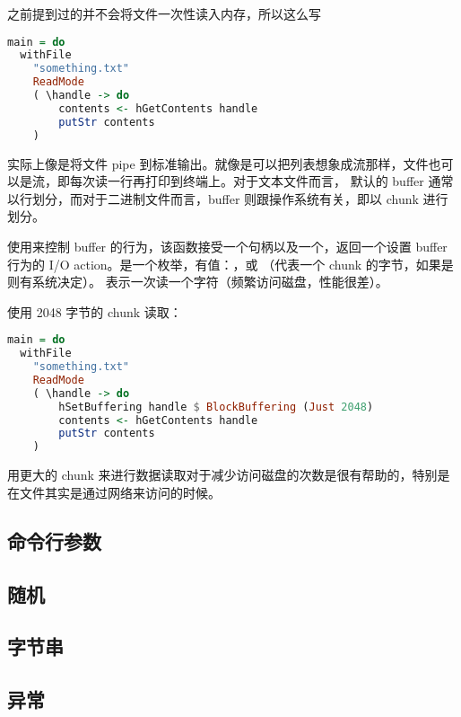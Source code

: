 \documentclass[./main.tex]{subfiles}
\begin{document}
之前提到过的并不会将文件一次性读入内存，所以这么写

\begin{lstlisting}[language=Haskell]
  main = do
  withFile
    "something.txt"
    ReadMode
    ( \handle -> do
        contents <- hGetContents handle
        putStr contents
    )
\end{lstlisting}

实际上像是将文件 pipe 到标准输出。就像是可以把列表想象成流那样，文件也可以是流，即每次读一行再打印到终端上。对于文本文件而言，
默认的 buffer 通常以行划分，而对于二进制文件而言，buffer 则跟操作系统有关，即以 chunk 进行划分。

使用来控制 buffer 的行为，该函数接受一个句柄以及一个，返回一个设置 buffer
行为的 I/O action。是一个枚举，有值：，或
（代表一个 chunk 的字节，如果是则有系统决定）。
表示一次读一个字符（频繁访问磁盘，性能很差）。

使用 2048 字节的 chunk 读取：

\begin{lstlisting}[language=Haskell]
  main = do
  withFile
    "something.txt"
    ReadMode
    ( \handle -> do
        hSetBuffering handle $ BlockBuffering (Just 2048)
        contents <- hGetContents handle
        putStr contents
    )
\end{lstlisting}

用更大的 chunk 来进行数据读取对于减少访问磁盘的次数是很有帮助的，特别是在文件其实是通过网络来访问的时候。




\subsection*{命令行参数}


\subsection*{随机}


\subsection*{字节串}


\subsection*{异常}

\end{document}
